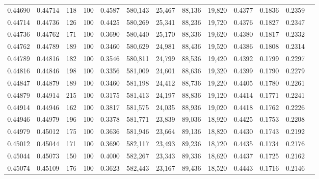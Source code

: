 \begin{tabular}{rrrrrrrrrrrrr}
0.44690 & 0.44714 &   118 & 100 &                                     0.4587 & 580,143 &  25,467 &  88,136 &  19,820 & 0.4377 & 0.1836 & 0.2359 \\
0.44714 & 0.44736 &   126 & 100 &                                     0.4425 & 580,269 &  25,341 &  88,236 &  19,720 & 0.4376 & 0.1827 & 0.2347 \\
0.44736 & 0.44762 &   171 & 100 &                                     0.3690 & 580,440 &  25,170 &  88,336 &  19,620 & 0.4380 & 0.1817 & 0.2332 \\
0.44762 & 0.44789 &   189 & 100 &                                     0.3460 & 580,629 &  24,981 &  88,436 &  19,520 & 0.4386 & 0.1808 & 0.2314 \\
0.44789 & 0.44816 &   182 & 100 &                                     0.3546 & 580,811 &  24,799 &  88,536 &  19,420 & 0.4392 & 0.1799 & 0.2297 \\
0.44816 & 0.44846 &   198 & 100 &                                     0.3356 & 581,009 &  24,601 &  88,636 &  19,320 & 0.4399 & 0.1790 & 0.2279 \\
0.44847 & 0.44879 &   189 & 100 &                                     0.3460 & 581,198 &  24,412 &  88,736 &  19,220 & 0.4405 & 0.1780 & 0.2261 \\
0.44879 & 0.44914 &   215 & 100 &                                     0.3175 & 581,413 &  24,197 &  88,836 &  19,120 & 0.4414 & 0.1771 & 0.2241 \\
0.44914 & 0.44946 &   162 & 100 &                                     0.3817 & 581,575 &  24,035 &  88,936 &  19,020 & 0.4418 & 0.1762 & 0.2226 \\
0.44946 & 0.44979 &   196 & 100 &                                     0.3378 & 581,771 &  23,839 &  89,036 &  18,920 & 0.4425 & 0.1753 & 0.2208 \\
0.44979 & 0.45012 &   175 & 100 &                                     0.3636 & 581,946 &  23,664 &  89,136 &  18,820 & 0.4430 & 0.1743 & 0.2192 \\
0.45012 & 0.45044 &   171 & 100 &                                     0.3690 & 582,117 &  23,493 &  89,236 &  18,720 & 0.4435 & 0.1734 & 0.2176 \\
0.45044 & 0.45073 &   150 & 100 &                                     0.4000 & 582,267 &  23,343 &  89,336 &  18,620 & 0.4437 & 0.1725 & 0.2162 \\
0.45074 & 0.45109 &   176 & 100 &                                     0.3623 & 582,443 &  23,167 &  89,436 &  18,520 & 0.4443 & 0.1716 & 0.2146 \\

\end{tabular}
